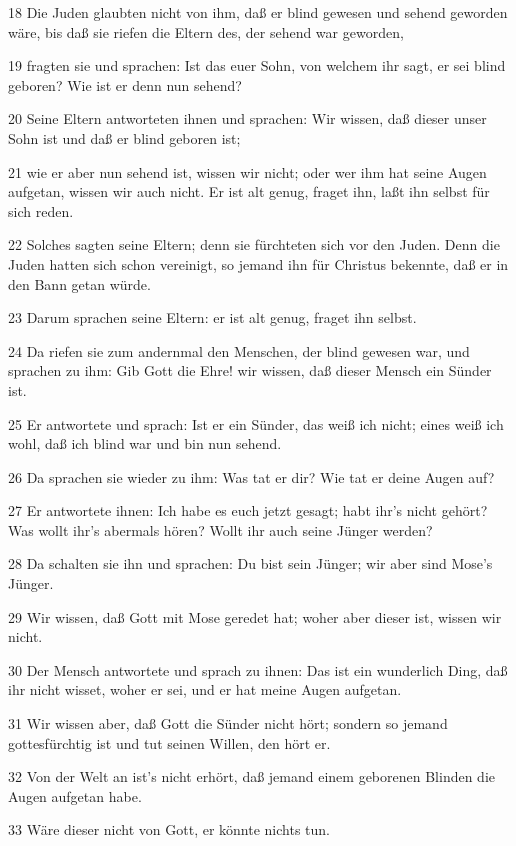 \par 18 Die Juden glaubten nicht von ihm, daß er blind gewesen und sehend geworden wäre, bis daß sie riefen die Eltern des, der sehend war geworden,
\par 19 fragten sie und sprachen: Ist das euer Sohn, von welchem ihr sagt, er sei blind geboren? Wie ist er denn nun sehend?
\par 20 Seine Eltern antworteten ihnen und sprachen: Wir wissen, daß dieser unser Sohn ist und daß er blind geboren ist;
\par 21 wie er aber nun sehend ist, wissen wir nicht; oder wer ihm hat seine Augen aufgetan, wissen wir auch nicht. Er ist alt genug, fraget ihn, laßt ihn selbst für sich reden.
\par 22 Solches sagten seine Eltern; denn sie fürchteten sich vor den Juden. Denn die Juden hatten sich schon vereinigt, so jemand ihn für Christus bekennte, daß er in den Bann getan würde.
\par 23 Darum sprachen seine Eltern: er ist alt genug, fraget ihn selbst.
\par 24 Da riefen sie zum andernmal den Menschen, der blind gewesen war, und sprachen zu ihm: Gib Gott die Ehre! wir wissen, daß dieser Mensch ein Sünder ist.
\par 25 Er antwortete und sprach: Ist er ein Sünder, das weiß ich nicht; eines weiß ich wohl, daß ich blind war und bin nun sehend.
\par 26 Da sprachen sie wieder zu ihm: Was tat er dir? Wie tat er deine Augen auf?
\par 27 Er antwortete ihnen: Ich habe es euch jetzt gesagt; habt ihr's nicht gehört? Was wollt ihr's abermals hören? Wollt ihr auch seine Jünger werden?
\par 28 Da schalten sie ihn und sprachen: Du bist sein Jünger; wir aber sind Mose's Jünger.
\par 29 Wir wissen, daß Gott mit Mose geredet hat; woher aber dieser ist, wissen wir nicht.
\par 30 Der Mensch antwortete und sprach zu ihnen: Das ist ein wunderlich Ding, daß ihr nicht wisset, woher er sei, und er hat meine Augen aufgetan.
\par 31 Wir wissen aber, daß Gott die Sünder nicht hört; sondern so jemand gottesfürchtig ist und tut seinen Willen, den hört er.
\par 32 Von der Welt an ist's nicht erhört, daß jemand einem geborenen Blinden die Augen aufgetan habe.
\par 33 Wäre dieser nicht von Gott, er könnte nichts tun.
